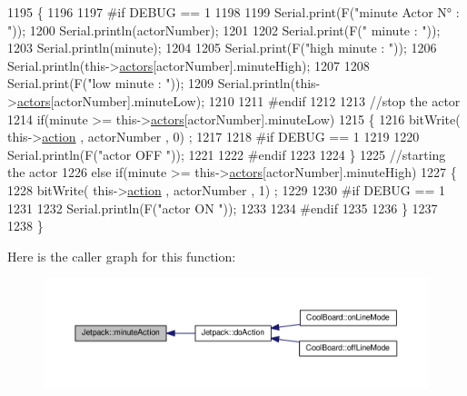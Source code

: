 \begin{DoxyCode}
1195 \{
1196 
1197 \textcolor{preprocessor}{#if DEBUG == 1}
1198     
1199     Serial.print(F(\textcolor{stringliteral}{"minute Actor N° : "}));
1200     Serial.println(actorNumber);
1201 
1202     Serial.print(F(\textcolor{stringliteral}{" minute : "}));
1203     Serial.println(minute);
1204 
1205     Serial.print(F(\textcolor{stringliteral}{"high minute : "}));
1206     Serial.println(this->\hyperlink{class_jetpack_a7e16d2f97837f9712a2e6de1c50d99db}{actors}[actorNumber].minuteHigh);
1207 
1208     Serial.print(F(\textcolor{stringliteral}{"low minute : "}));
1209     Serial.println(this->\hyperlink{class_jetpack_a7e16d2f97837f9712a2e6de1c50d99db}{actors}[actorNumber].minuteLow);
1210 
1211 \textcolor{preprocessor}{#endif}
1212 
1213     \textcolor{comment}{//stop the actor    }
1214     \textcolor{keywordflow}{if}(minute >= this->\hyperlink{class_jetpack_a7e16d2f97837f9712a2e6de1c50d99db}{actors}[actorNumber].minuteLow)
1215     \{
1216         bitWrite( this->\hyperlink{class_jetpack_aca3142925a7b0834b34ae91d26af7765}{action} , actorNumber , 0) ;
1217 
1218 \textcolor{preprocessor}{    #if DEBUG == 1 }
1219 
1220         Serial.println(F(\textcolor{stringliteral}{"actor OFF "}));
1221 
1222 \textcolor{preprocessor}{    #endif  }
1223 
1224     \}   
1225     \textcolor{comment}{//starting the actor}
1226     \textcolor{keywordflow}{else} \textcolor{keywordflow}{if}(minute >= this->\hyperlink{class_jetpack_a7e16d2f97837f9712a2e6de1c50d99db}{actors}[actorNumber].minuteHigh)
1227     \{
1228         bitWrite( this->\hyperlink{class_jetpack_aca3142925a7b0834b34ae91d26af7765}{action} , actorNumber , 1) ;
1229 
1230 \textcolor{preprocessor}{    #if DEBUG == 1 }
1231 
1232         Serial.println(F(\textcolor{stringliteral}{"actor ON "}));
1233 
1234 \textcolor{preprocessor}{    #endif  }
1235 
1236     \}
1237 
1238 \} 
\end{DoxyCode}
Here is the caller graph for this function\+:\nopagebreak
\begin{figure}[H]
\begin{center}
\leavevmode
\includegraphics[width=350pt]{df/d1d/class_jetpack_a97da41141c7b53ddee61143519c8d17d_icgraph}
\end{center}
\end{figure}
\mbox{\label{class_jetpack_ac1a49ab4867718cdb415ad74c2066b9d}} 
